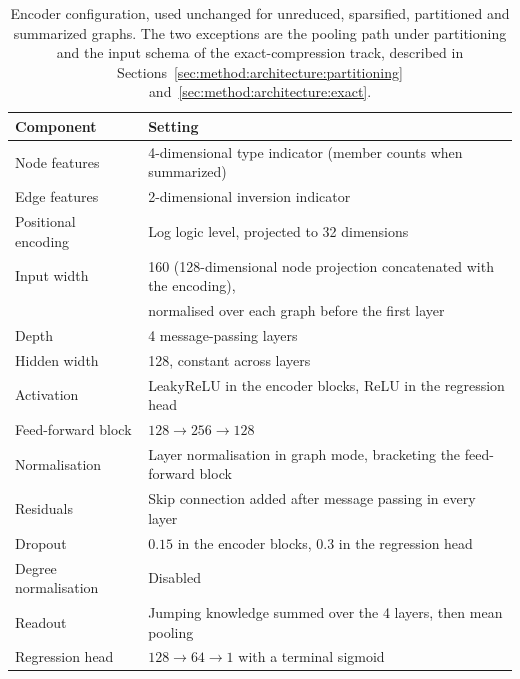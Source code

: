 \begin{table}[htbp]
\centering
\caption[Encoder configuration]{Encoder configuration, used unchanged for unreduced,
sparsified, partitioned and summarized graphs. The two exceptions are the pooling path
under partitioning and the input schema of the exact-compression track, described in
Sections~\ref{sec:method:architecture:partitioning}
and~\ref{sec:method:architecture:exact}.}
\label{tab:method:architecture}
\small
\begin{tabular}{ll}
\toprule
\textbf{Component} & \textbf{Setting} \\
\midrule
Node features & 4-dimensional type indicator (member counts when summarized) \\
Edge features & 2-dimensional inversion indicator \\
Positional encoding & Log logic level, projected to 32 dimensions \\
Input width & 160 (128-dimensional node projection concatenated with the encoding), \\
 & normalised over each graph before the first layer \\
Depth & 4 message-passing layers \\
Hidden width & 128, constant across layers \\
Activation & LeakyReLU in the encoder blocks, ReLU in the regression head \\
Feed-forward block & $128 \rightarrow 256 \rightarrow 128$ \\
Normalisation & Layer normalisation in graph mode, bracketing the feed-forward block \\
Residuals & Skip connection added after message passing in every layer \\
Dropout & $0.15$ in the encoder blocks, $0.3$ in the regression head \\
Degree normalisation & Disabled \\
Readout & Jumping knowledge summed over the 4 layers, then mean pooling \\
Regression head & $128 \rightarrow 64 \rightarrow 1$ with a terminal sigmoid \\
\bottomrule
\end{tabular}
\end{table}

